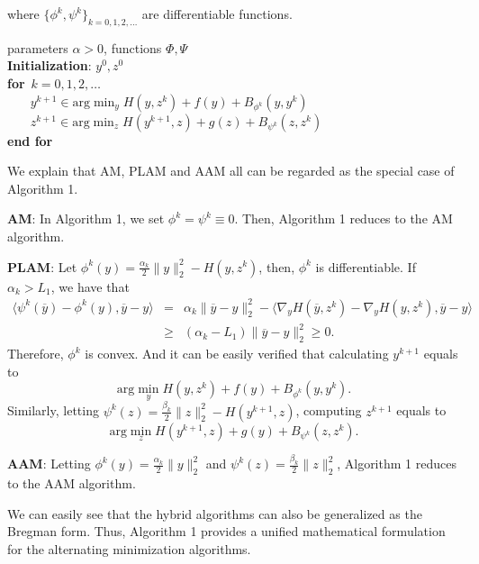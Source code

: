 \documentclass[12pt]{article}
\begin{document}
where $\{\phi^k,\psi^k\}_{k=0,1,2,\ldots}$ are differentiable functions.
\begin{algorithm}
\caption{Bregman Alternating Minimization Algorithm}
\begin{algorithmic}\label{alg1}
\REQUIRE   parameters $\alpha>0$, functions $\Phi,\Psi$\\
\textbf{Initialization}: $y^0,z^{0}$\\
\textbf{for}~$k=0,1,2,\ldots$ \\
~~~ $y^{k+1}\in \textrm{arg}\min_{y} H(y,z^k)+f(y)+B_{\phi^k}(y,y^k)$ \\
~~~ $z^{k+1}\in \textrm{arg}\min_{z} H(y^{k+1},z)+g(z)+B_{\psi^k}(z,z^k)$ \\
\textbf{end for}\\
\end{algorithmic}
\end{algorithm}
We explain that   AM, PLAM and AAM all can be regarded as the special case of  Algorithm 1.

\textbf{AM}: In Algorithm 1, we set $\phi^k=\psi^k\equiv 0$. Then, Algorithm 1 reduces to the AM algorithm.

\textbf{PLAM}: Let $\phi^k(y)=\frac{\alpha_k}{2}\|y\|_2^2-H(y,z^k)$, then, $\phi^k$ is differentiable.  If $\alpha_k>L_1$, we have that
\begin{eqnarray}
\langle \psi^k(\overline{y})-\phi^k(y),\overline{y}-y\rangle&=&\alpha_k\|\overline{y}-y\|_2^2-\langle \nabla_y H(\overline{y},z^k)-\nabla_y H(y,z^k) ,\overline{y}-y\rangle\nonumber\\
&\geq&(\alpha_k-L_1)\|\overline{y}-y\|_2^2\geq0.
\end{eqnarray}
Therefore, $\phi^k$ is convex. And it can be easily verified that calculating $y^{k+1}$ equals to
\begin{equation}
   \textrm{arg}\min_{y} H(y,z^k)+f(y)+B_{\phi^k}(y,y^k).
\end{equation}
Similarly, letting $\psi^k(z)=\frac{\beta_k}{2}\|z\|_2^2-H(y^{k+1},z)$, computing $z^{k+1}$ equals to
\begin{equation}
   \textrm{arg}\min_{z} H(y^{k+1},z)+g(y)+B_{\psi^k}(z,z^k).
\end{equation}

\textbf{AAM}: Letting $\phi^k(y)=\frac{\alpha_k}{2}\|y\|_2^2$ and $\psi^k(z)=\frac{\beta_k}{2}\|z\|_2^2$, Algorithm 1 reduces to the AAM algorithm.

We can easily see that the hybrid algorithms can also be generalized as the Bregman form. Thus,   Algorithm 1 provides a unified mathematical formulation for the alternating minimization algorithms.
\end{document}
